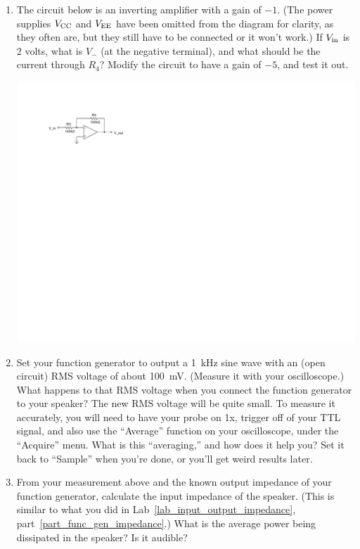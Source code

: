 \begin{enumerate}[wide]
\item The circuit below is an inverting amplifier with a gain of $-1$.  (The power supplies $V_{\rm CC}$ and $V_{\rm EE}$ have been omitted from the diagram for clarity, as they often are, but they still have to be connected or it won't work.)  If $V_{\rm in}$ is 2 volts, what is $V_-$ (at the negative terminal), and what should be the current through $R_4$?  Modify the circuit to have a gain of $-5$, and test it out.  
\begin{center}
\includegraphics{op-amps/inverting.pdf}
\end{center}
\label{part_inverting_amplifier}

\item Set your function generator to output a 1~kHz sine wave with an (open circuit) RMS voltage of about 100~mV.  (Measure it with your oscilloscope.)  What happens to that RMS voltage when you connect the function generator to your speaker?  The new RMS voltage will be quite small.  To measure it accurately, you will need to have your probe on 1x, trigger off of your TTL signal, and also use the ``Average'' function on your oscilloscope, under the ``Acquire'' menu.  What is this ``averaging,'' and how does it help you?  Set it back to ``Sample'' when you're done, or you'll get weird results later.

\item From your measurement above and the known output impedance of your function generator, calculate the input impedance of the speaker.  (This is similar to what you did in Lab~\ref{lab_input_output_impedance}, part~\ref{part_func_gen_impedance}.)  What is the average power being dissipated in the speaker?  Is it audible? \label{part_nobuffer}


\end{enumerate}

